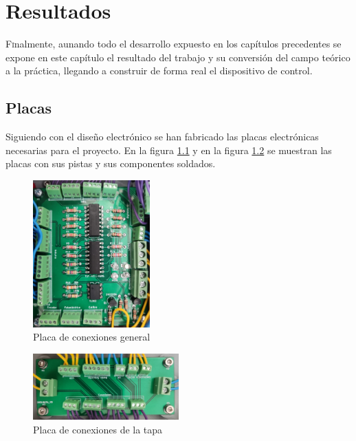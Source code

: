 \chapter{Resultados}\label{chp-07}

\lettrine[lraise=-0.1, lines=2, loversize=0.2]{F}inalmente, aunando todo el desarrollo expuesto en los capítulos precedentes se expone en este capítulo el resultado del trabajo y su conversión del campo teórico a la práctica, llegando a construir de forma real el dispositivo de control.

\section{Placas}

Siguiendo con el diseño electrónico se han fabricado las placas electrónicas necesarias para el proyecto.
En la figura \ref{fig:placafondo} y en la figura \ref{fig:placatapa} se muestran las placas con sus pistas y sus componentes soldados.

\begin{figure}[hbtp]%
    \centering 
        \includegraphics[width=0.4\textwidth]{07-resultados/placafondo.jpg}
    \caption{Placa de conexiones general}
    \label{fig:placafondo} 
\end{figure}

\begin{figure}[hbtp]%
    \centering 
        \includegraphics[width=0.5\textwidth]{07-resultados/placatapa.jpg}
    \caption{Placa de conexiones de la tapa}
    \label{fig:placatapa} 
\end{figure}

